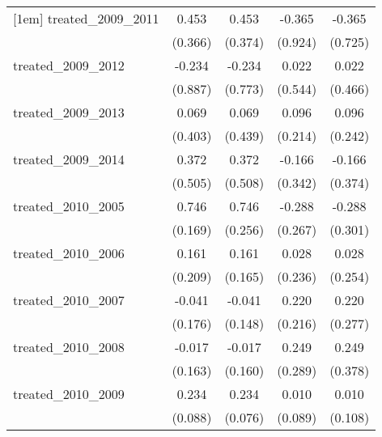 {\begin{tabular}{l*{4}{c}}
[1em]
treated\_2009\_2011&       0.453         &       0.453         &      -0.365         &      -0.365         \\
            &     (0.366)         &     (0.374)         &     (0.924)         &     (0.725)         \\
[1em]
treated\_2009\_2012&      -0.234         &      -0.234         &       0.022         &       0.022         \\
            &     (0.887)         &     (0.773)         &     (0.544)         &     (0.466)         \\
[1em]
treated\_2009\_2013&       0.069         &       0.069         &       0.096         &       0.096         \\
            &     (0.403)         &     (0.439)         &     (0.214)         &     (0.242)         \\
[1em]
treated\_2009\_2014&       0.372         &       0.372         &      -0.166         &      -0.166         \\
            &     (0.505)         &     (0.508)         &     (0.342)         &     (0.374)         \\
[1em]
treated\_2010\_2005&       0.746\sym{***}&       0.746\sym{**} &      -0.288         &      -0.288         \\
            &     (0.169)         &     (0.256)         &     (0.267)         &     (0.301)         \\
[1em]
treated\_2010\_2006&       0.161         &       0.161         &       0.028         &       0.028         \\
            &     (0.209)         &     (0.165)         &     (0.236)         &     (0.254)         \\
[1em]
treated\_2010\_2007&      -0.041         &      -0.041         &       0.220         &       0.220         \\
            &     (0.176)         &     (0.148)         &     (0.216)         &     (0.277)         \\
[1em]
treated\_2010\_2008&      -0.017         &      -0.017         &       0.249         &       0.249         \\
            &     (0.163)         &     (0.160)         &     (0.289)         &     (0.378)         \\
[1em]
treated\_2010\_2009&       0.234\sym{**} &       0.234\sym{**} &       0.010         &       0.010         \\
            &     (0.088)         &     (0.076)         &     (0.089)         &     (0.108)         \\

\end{tabular}}

